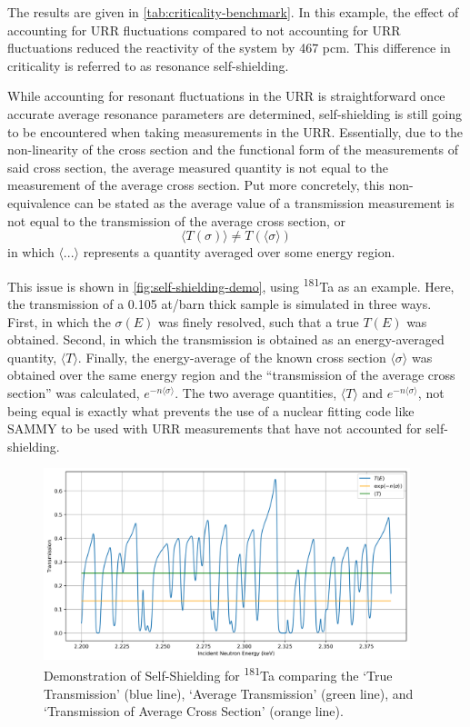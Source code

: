     The results are given in \autoref{tab:criticality-benchmark}. In this example, the effect of accounting for URR fluctuations compared to not accounting for URR fluctuations reduced the reactivity of the system by 467 pcm. This difference in criticality is referred to as resonance self-shielding.

    While accounting for resonant fluctuations in the URR is straightforward once accurate average resonance parameters are determined, self-shielding is still going to be encountered when taking measurements in the URR. Essentially, due to the non-linearity of the cross section and the functional form of the measurements of said cross section, the average measured quantity is not equal to the measurement of the average cross section. Put more concretely, this non-equivalence can be stated as the average value of a transmission measurement is not equal to the transmission of the average cross section, or
    \begin{equation}
        \label{eq:self-shielding}
        \langle T (\sigma) \rangle \neq T(\langle \sigma \rangle)
    \end{equation}
    in which $\langle ... \rangle$ represents a quantity averaged over some energy region.
    
    This issue is shown in \autoref{fig:self-shielding-demo}, using \textsuperscript{181}Ta as an example. Here, the transmission of a 0.105 at/barn thick sample is simulated in three ways. First, in which the $\sigma(E)$ was finely resolved, such that a true $T(E)$ was obtained. Second, in which the transmission is obtained as an energy-averaged quantity, $\langle T \rangle$. Finally, the energy-average of the known cross section $\langle \sigma \rangle$ was obtained over the same energy region and the ``transmission of the average cross section'' was calculated, $e^{-n \langle \sigma \rangle}$. The two average quantities, $\langle T\rangle$ and $e^{-n \langle \sigma \rangle}$, not being equal is exactly what prevents the use of a nuclear fitting code like SAMMY\cite{sammy} to be used with URR measurements that have not accounted for self-shielding.

    \begin{figure}
        \centering
        \includegraphics[width=0.95\textwidth]{Introduction/Figures/transmission-example.png}
        \caption{Demonstration of Self-Shielding for \textsuperscript{181}Ta comparing the `True Transmission' (blue line), `Average Transmission' (green line), and `Transmission of Average Cross Section' (orange line).}
        \label{fig:self-shielding-demo}
    \end{figure}

